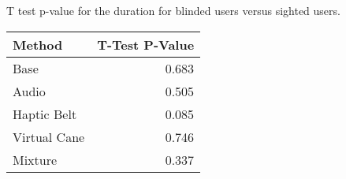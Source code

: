 
\centering
\caption{T test p-value for the duration for blinded users versus sighted users.}
\label{tab:ttest_duration}
\begin{tabular}{lr}
\toprule
      Method &  T-Test P-Value \\
\midrule
        Base &           0.683 \\
       Audio &           0.505 \\
 Haptic Belt &           0.085 \\
Virtual Cane &           0.746 \\
     Mixture &           0.337 \\
\bottomrule
\end{tabular}

